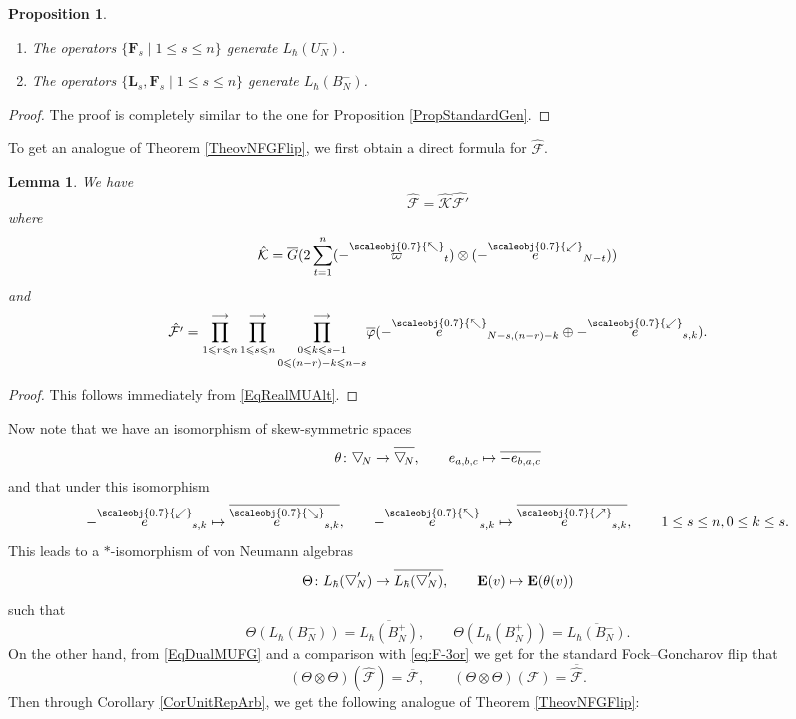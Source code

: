 \documentclass[11pt, reqno]{amsart}
\newtheorem{lemma}[theorem]{Lemma}
\newtheorem{prop}[theorem]{Proposition}
\theoremstyle{definition}
\numberwithin{equation}{section}
\def\longra{\longrightarrow}
\def\le{\leqslant}
\def\Fc{\mathcal F'}
\newcommand{\eb}{\mathbf{E}}
\newcommand{\Gauss}{G}
\newcommand{\Kc}{\mathcal{K}}
\newcommand{\Fct}{\mathcal{F}}
\newcommand{\Nilp}{U}
\newcommand{\Bor}{B}
\newcommand{\nears}{\scaleobj{0.7}{\nearrow}}
\newcommand{\sears}{\scaleobj{0.7}{\searrow}}
\newcommand{\nwars}{\scaleobj{0.7}{\nwarrow}}
\newcommand{\swars}{\scaleobj{0.7}{\swarrow}}
\newcommand{\nee}{\overset{\nears}{e}}
\newcommand{\seee}{\overset{\sears}{e}}
\newcommand{\nwe}{\overset{\nwars}{e}}
\newcommand{\swe}{\overset{\swars}{e}}
\newcommand{\nwvarpi}{\overset{\nwars}{\varpi}}
\newcommand{\Lb}{\mathbf{L}}
\newcommand{\btd}[1]{\raisebox{\depth}{$\bigtriangledown$\!}_{#1}}
\newcommand{\wbtd}[1]{\raisebox{\depth}{$\bigtriangledown'$\!\!}_{#1}}
\def\stgF{\mathbf{F}}
\begin{document}
\begin{prop}\label{PropStandardGenDual}
\begin{enumerate}
\item
The operators $\{\stgF_s\mid 1\leq s\leq n\}$ generate $L_{\hbar}(\Nilp_N^-)$.
\item The operators $\{\Lb_s,\stgF_s\mid 1\leq s \leq n\}$ generate $L_{\hbar}(\Bor_N^-)$.
\end{enumerate}
\end{prop}
\begin{proof}
The proof is completely similar to the one for Proposition \ref{PropStandardGen}.
\end{proof}

To get an analogue of Theorem \ref{TheovNFGFlip}, we first obtain a direct formula for $\hat{\Fct}$.  


\begin{lemma}\label{LemDualFG}
We have 
\begin{equation}\label{EqDualMUFG}
\hat{\Fct} = \hat{\Kc}\hat{\Fc}
\end{equation}
where 
\[
\hat{\Kc} = \overline{\Gauss}(2\sum_{t=1}^n  (-\nwvarpi_t)\otimes (-\swe_{N-t}))
\]
and
\[
\hat{\Fc} =  \prod_{1 \le r \le n}^{\longra} \prod_{1 \le s \le n}^{\longra} \underset{0\le (n-r)-k\le n-s}{\prod_{0 \le k \le s-1}^{\longra}}\overline{\varphi}(-\nwe_{N-s,(n-r)-k}\oplus -\swe_{s,k}).
\]
\end{lemma}
\begin{proof}
This follows immediately from \eqref{EqRealMUAlt}.
\end{proof} 

Now note that we have an isomorphism of skew-symmetric spaces
\begin{equation}\label{EqFormtheta}
\theta\colon  \btd{N} \rightarrow \overline{\btd{N}},\qquad e_{a,b,c} \mapsto \overline{-e_{b,a,c}}
\end{equation}
and that under this isomorphism
\[
- \swe_{s,k} \mapsto \overline{\seee_{s,k}},\qquad - \nwe_{s,k}\mapsto \overline{\nee_{s,k}},\qquad 1\leq s\leq n,0\leq k \leq s. 
\]
This leads to a $*$-isomorphism of von Neumann algebras
\begin{equation}\label{EqThetaIso}
\Theta\colon  L_{\hbar}(\wbtd{N}) \rightarrow \overline{L_{\hbar}(\wbtd{N})},\qquad \eb(v) \mapsto \eb(\theta(v))
\end{equation}
such that
\begin{equation}\label{EqThetaIm}
\Theta(L_{\hbar}(\Bor_N^-)) = \overline{L_{\hbar}(\Bor_N^+)},\qquad \Theta(L_{\hbar}(\Bor_N^+)) = \overline{L_{\hbar}(\Bor_N^-)}.
\end{equation}
On the other hand, from \eqref{EqDualMUFG} and a comparison with \eqref{eq:F-3or} we get for the standard Fock--Goncharov flip that
\begin{equation}\label{EqSelfDual}
(\Theta\otimes \Theta)(\hat{\Fct}) = \overline{\Fct},\qquad (\Theta\otimes \Theta)(\Fct) = \overline{\hat{\Fct}}.
\end{equation}
Then through Corollary \ref{CorUnitRepArb}, we get the following analogue of Theorem \ref{TheovNFGFlip}:
\end{document}
